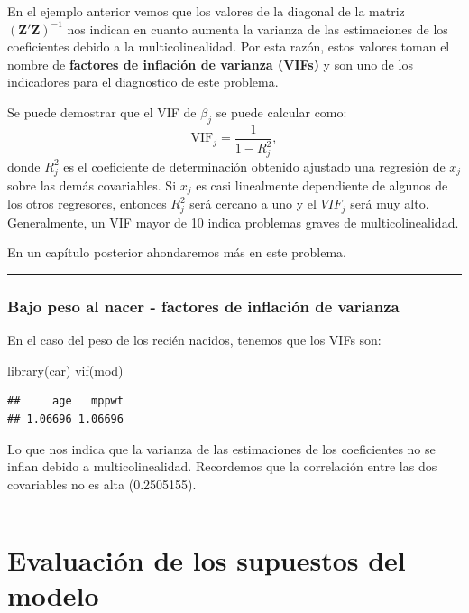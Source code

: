 \documentclass[
]{article}
\newenvironment{Shaded}{\begin{snugshade}}{\end{snugshade}}
\newcommand{\FunctionTok}[1]{\textcolor[rgb]{0.00,0.00,0.00}{#1}}
\newcommand{\NormalTok}[1]{#1}
\begin{document}
En el ejemplo anterior vemos que los valores de la diagonal de la matriz \((\boldsymbol Z'\boldsymbol Z)^{-1}\) nos indican en cuanto aumenta la varianza de las estimaciones de los coeficientes debido a la multicolinealidad. Por esta razón, estos valores toman el nombre de \textbf{factores de inflación de varianza (VIFs)} y son uno de los indicadores para el diagnostico de este problema.

Se puede demostrar que el VIF de \(\beta_{j}\) se puede calcular como:
\[
\mbox{VIF}_{j} = \frac{1}{1-R^{2}_{j}},
\]
donde \(R^{2}_{j}\) es el coeficiente de determinación obtenido ajustado una regresión de \(x_{j}\) sobre las demás covariables. Si \(x_{j}\) es casi linealmente dependiente de algunos de los otros regresores, entonces \(R^{2}_{j}\) será cercano a uno y el \(VIF_{j}\) será muy alto. Generalmente, un VIF mayor de 10 indica problemas graves de multicolinealidad.

En un capítulo posterior ahondaremos más en este problema.

\rule{\textwidth}{0.4pt}

\hypertarget{bajo-peso-al-nacer---factores-de-inflaciuxf3n-de-varianza}{%
\subsubsection{Bajo peso al nacer - factores de inflación de varianza}\label{bajo-peso-al-nacer---factores-de-inflaciuxf3n-de-varianza}}

En el caso del peso de los recién nacidos, tenemos que los VIFs son:

\begin{Shaded}
\begin{Highlighting}[]
\FunctionTok{library}\NormalTok{(car)}
\FunctionTok{vif}\NormalTok{(mod)}
\end{Highlighting}
\end{Shaded}

\begin{verbatim}
##     age   mppwt 
## 1.06696 1.06696
\end{verbatim}

Lo que nos indica que la varianza de las estimaciones de los coeficientes no se inflan debido a multicolinealidad. Recordemos que la correlación entre las dos covariables no es alta (0.2505155).

\rule{\textwidth}{0.4pt}

\hypertarget{evaluaciuxf3n-de-los-supuestos-del-modelo}{%
\section{Evaluación de los supuestos del modelo}\label{evaluaciuxf3n-de-los-supuestos-del-modelo}}
\end{document}

